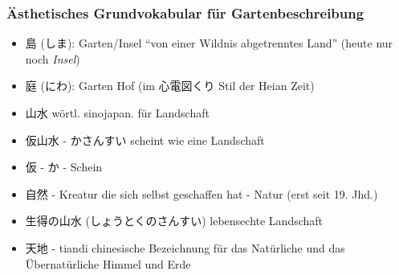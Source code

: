 \documentclass[emulatestandardclasses]{scrartcl}
\begin{document}
\subsubsection{Ästhetisches Grundvokabular für Gartenbeschreibung}

\begin{itemize}
  \item 島 (しま): Garten/Insel "`von einer Wildnis abgetrenntes Land"' (heute nur noch \emph{Insel})
  \item 庭 (にわ): Garten Hof (im 心電図くり Stil der Heian Zeit)
  \item 山水 wörtl. sinojapan. für Landschaft
  \item 仮山水 - かさんすい scheint wie eine Landschaft
  \item 仮 - か - Schein
  \item 自然 - Kreatur die sich selbst geschaffen hat - Natur (erst seit 19. Jhd.)
  \item 生得の山水 (しょうとくのさんすい) lebensechte Landschaft
  \item 天地 - tiandi chinesische Bezeichnung für das Natürliche und das Übernatürliche Himmel und Erde
\end{itemize}
\end{document}
